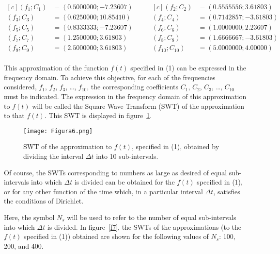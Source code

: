 \documentclass[11pt]{rMTA2010} \usepackage[utf8]{inputenc} \usepackage{graphicx} \usepackage{booktabs} \usepackage{array} \usepackage{enumerate}
\begin{document}
\begin{equation*}
\begin{aligned}[c]
(f_{1}; C_{1}) &= (0.5000000; -7.23607)  \\
(f_{3}; C_{3}) &= (0.6250000; 10.85410)   \\
(f_{5}; C_{5}) &= (0.8333333; -7.23607)   \\
(f_{7}; C_{7}) &= (1.2500000; 3.61803)\\
(f_{9}; C_{9}) &= (2.5000000; 3.61803)\\
\end{aligned}
\qquad
\begin{aligned}[c]
(f_{2}; C_{2})&=    (0.5555556; 3.61803) \\
(f_{4}; C_{4}) &=   (0.7142857; -3.61803)   \\
(f_{6}; C_{6}) &=   (1.0000000; 2.23607)  \\
(f_{8}; C_{8}) &=   (1.6666667; -3.61803)\\
(f_{10}; C_{10}) &= (5.0000000; 4.00000) \\
\end{aligned}
\end{equation*}

This approximation of the function $f(t)$ specified in (1) can be expressed in the frequency domain. To achieve this objective, for each of the frequencies considered, $f_1$, $f_2$, $f_3$, \ldots, $f_{10}$, the corresponding coefficients $C_1$, $C_2$, $C_3$, \ldots, $C_{10}$ must be indicated. The expression in the frequency domain of this approximation to $f(t)$ will be called the Square Wave Transform (SWT) of the approximation to that $f(t)$. This SWT is displayed in figure~\ref{f6}.

\begin{figure}[H]
\centering
\texttt{[image: Figura6.png]}
\caption{SWT of the approximation to $f(t)$, specified in (1), obtained by dividing the interval $\Delta t$ into 10 sub-intervals.}
\label{f6}
\end{figure}

Of course, the SWTs corresponding to numbers as large as desired of equal sub-intervals into which $\Delta t$ is divided can be obtained for the $f(t)$ specified in (1), or for any other function of the time which, in a particular interval $\Delta t$, satisfies the conditions of Dirichlet.

Here, the symbol $N_{s}$ will be used to refer to the number of equal sub-intervals into which $\Delta t$ is divided. In figure~\ref{f7}, the SWTs of the approximations (to the $f(t)$ specified in (1)) obtained are shown for the following values of $N_{s}$: 100, 200, and 400.
\end{document}
